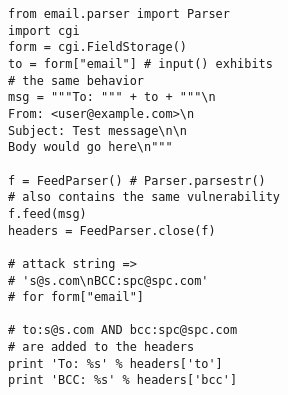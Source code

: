 \begin{lstlisting}
from email.parser import Parser
import cgi
form = cgi.FieldStorage()
to = form["email"] # input() exhibits 
# the same behavior
msg = """To: """ + to + """\n
From: <user@example.com>\n
Subject: Test message\n\n
Body would go here\n"""

f = FeedParser() # Parser.parsestr() 
# also contains the same vulnerability
f.feed(msg)
headers = FeedParser.close(f)

# attack string => 
# 's@s.com\nBCC:spc@spc.com'
# for form["email"]

# to:s@s.com AND bcc:spc@spc.com 
# are added to the headers
print 'To: %s' % headers['to']
print 'BCC: %s' % headers['bcc']
\end{lstlisting}